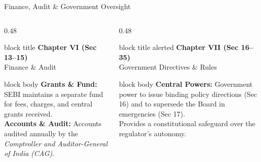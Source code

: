 \documentclass[aspectratio=169,10pt]{beamer}
\begin{document}
	\begin{frame}{Finance, Audit \& Government Oversight}
		\begin{columns}[T, onlytextwidth]
			\begin{column}{0.48\textwidth}
				\begin{beamercolorbox}[rounded=true, sep=4pt]{block title}
					\centering\textbf{Chapter VI \; (Sec 13--15)}\\[2pt]
					\textcolor{rpBase}{\small Finance \& Audit}
				\end{beamercolorbox}
				\vspace{-4pt}
				\begin{beamercolorbox}[rounded=true, sep=5pt]{block body}
					\small
					\textbf{Grants \& Fund:} SEBI maintains a separate fund for fees, charges, and central grants received.\\[6pt]
					\textbf{Accounts \& Audit:} Accounts audited annually by the \textit{Comptroller and Auditor-General of India (CAG)}.
				\end{beamercolorbox}
			\end{column}
			\begin{column}{0.48\textwidth}
				\begin{beamercolorbox}[rounded=true, sep=4pt]{block title alerted}
					\centering\textbf{Chapter VII \; (Sec 16--35)}\\[2pt]
					\textcolor{rpBase}{\small Government Directives \& Rules}
				\end{beamercolorbox}
				\vspace{-4pt}
				\begin{beamercolorbox}[rounded=true, sep=5pt]{block body}
					\small
					\textbf{Central Powers:} Government power to issue binding policy directions (\textcolor{rpGold}{Sec 16}) and to supersede the Board in emergencies (\textcolor{rpGold}{Sec 17}).\\[6pt]
					Provides a constitutional safeguard over the regulator's autonomy.
				\end{beamercolorbox}
			\end{column}
		\end{columns}
	\end{frame}
	
\end{document}

